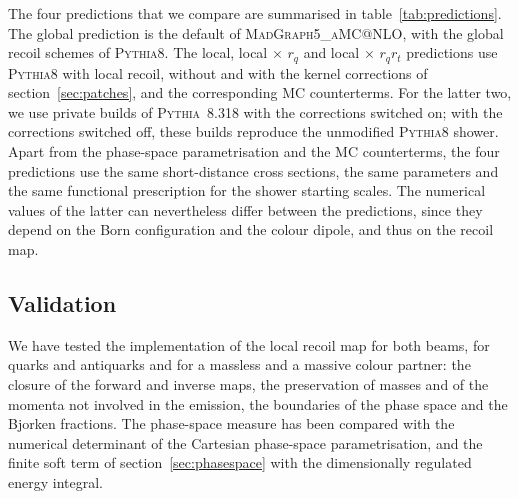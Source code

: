 \documentclass[a4paper,11pt]{article}
\makeatletter
\newcommand{\mgamc}{\textsc{MadGraph5\_aMC@NLO}\xspace}
\newcommand{\pythia}{\textsc{Pythia8}\xspace}
\newcommand{\glob}{global\xspace}
\newcommand{\loc}{local\xspace}
\newcommand{\locq}{local$\,{\times}\,r_q$\xspace}
\newcommand{\locqt}{local$\,{\times}\,r_qr_t$\xspace}
\makeatother
\begin{document}
The four predictions that we compare are summarised in
table~\ref{tab:predictions}. The \glob prediction is the default of
\mgamc, with the global recoil schemes of \pythia. The \loc, \locq and
\locqt predictions use \pythia with local recoil, without and with the
kernel corrections of section~\ref{sec:patches}, and the corresponding
MC counterterms. For the latter two, we use private builds of
\textsc{Pythia}~8.318 with the corrections switched on; with the corrections
switched off, these builds reproduce the unmodified \pythia shower.
Apart from the phase-space parametrisation and the MC counterterms,
the four predictions use the same short-distance cross sections, the
same parameters and the same functional prescription for the shower
starting scales. The numerical values of the latter can nevertheless
differ between the predictions, since they depend on the Born
configuration and the colour dipole, and thus on the recoil map.

\subsection{Validation}
\label{sec:validation}

We have tested the implementation of the local recoil map for both
beams, for quarks and antiquarks and for a massless and a massive
colour partner: the closure of the forward and inverse maps, the
preservation of masses and of the momenta not involved in the
emission, the boundaries of the phase space and the Bjorken fractions.
The phase-space measure has been compared with the numerical
determinant of the Cartesian phase-space parametrisation, and the
finite soft term of section~\ref{sec:phasespace} with the dimensionally
regulated energy integral.
\end{document}
